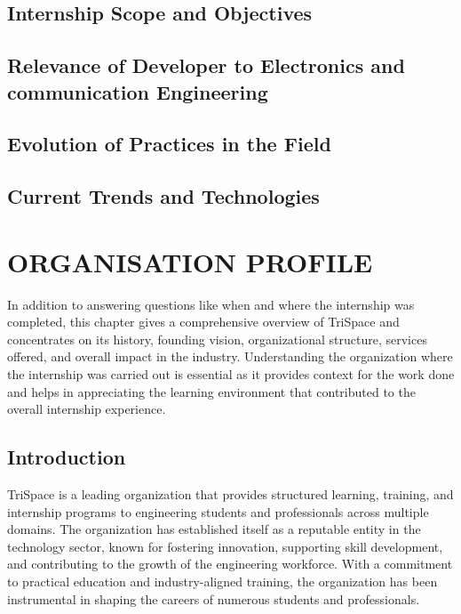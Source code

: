 \documentclass[12pt,a4paper]{report}
\begin{document}
\section{Internship Scope and Objectives}


\section{Relevance of Developer to Electronics and communication Engineering}


\section{Evolution of Practices in the Field}


\section{Current Trends and Technologies}




\chapter{ORGANISATION PROFILE}
\label{ch:org}


In addition to answering questions like when and where the internship was completed, this chapter gives a comprehensive overview of TriSpace and concentrates on its history, founding vision, organizational structure, services offered, and overall impact in the industry. Understanding the organization where the internship was carried out is essential as it provides context for the work done and helps in appreciating the learning environment that contributed to the overall internship experience.


\section{Introduction}

TriSpace is a leading organization that provides structured learning, training, and internship programs to engineering students and professionals across multiple domains. The organization has established itself as a reputable entity in the technology sector, known for fostering innovation, supporting skill development, and contributing to the growth of the engineering workforce. With a commitment to practical education and industry-aligned training, the organization has been instrumental in shaping the careers of numerous students and professionals.
\end{document}
